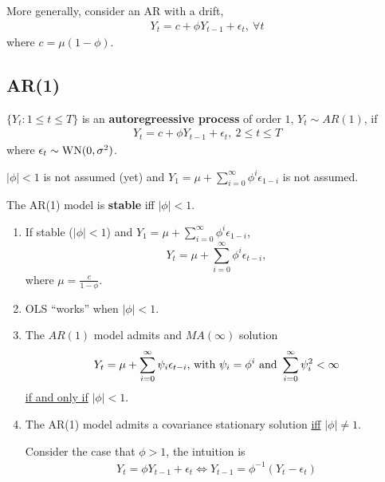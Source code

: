 \documentclass[11pt]{elegantbook}
\begin{document}
More generally, consider an AR with a drift,
\begin{equation}
    \begin{aligned}
        Y_t=c+\phi Y_{t-1}+\epsilon_t,\ \forall t
    \end{aligned}
    \nonumber
\end{equation}
where $c=\mu(1-\phi)$.

\subsection{AR(1)}
\begin{definition}[$AR(1)$]
    $\{Y_t:1\leq t\leq T\}$ is an \textbf{autoregreessive process} of order $1$, $Y_t\sim AR(1)$, if
    \begin{equation}
        \begin{aligned}
            Y_t=c+\phi Y_{t-1}+\epsilon_t,\ 2\leq t\leq T
        \end{aligned}
        \nonumber
    \end{equation}
    where $\epsilon_t\sim \textnormal{WN}(0,\sigma^2)$.
    \begin{note}
        $|\phi|<1$ is not assumed (yet) and $Y_1=\mu+\sum_{i=0}^\infty \phi^i\epsilon_{1-i}$ is not assumed.
    \end{note}
\end{definition}
\begin{definition}[Stability of $AR(1)$]
    The AR(1) model is \textbf{stable} iff $|\phi|<1$.
\end{definition}

\begin{enumerate}[$\circ$]
    \item If stable ($|\phi|<1$) and $Y_1=\mu+\sum_{i=0}^\infty \phi^i\epsilon_{1-i}$, $$Y_t=\mu+\sum_{i=0}^\infty \phi^i\epsilon_{t-i},$$ where $\mu=\frac{c}{1-\phi}$.
    \item OLS ``works'' when $|\phi|<1$.
    \item The $AR(1)$ model admits and $MA(\infty)$ solution
    \begin{equation}
        \begin{aligned}
            Y_t=\mu+\sum_{i=0}^\infty \psi_i\epsilon_{t-i}\textnormal{, with $\psi_i=\phi^i$ and }\sum_{i=0}^\infty \psi_i^2<\infty
        \end{aligned}
        \nonumber
    \end{equation}
    \underline{if and only if} $|\phi|<1$.
    \item The AR(1) model admits a covariance stationary solution \underline{iff} $|\phi|\neq 1$.
    \begin{note}
        Consider the case that $\phi>1$, the intuition is
        \begin{equation}
            \begin{aligned}
                Y_t=\phi Y_{t-1}+\epsilon_t \Leftrightarrow Y_{t-1}=\phi^{-1}(Y_t-\epsilon_t)
            \end{aligned}
            \nonumber
        \end{equation}
    \end{note}
\end{enumerate}
\end{document}
